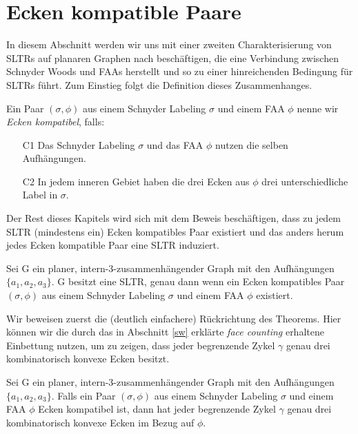 \section{Ecken kompatible Paare}

In diesem Abschnitt werden wir uns mit einer zweiten Charakterisierung von SLTRs auf planaren Graphen nach \cite{af15} beschäftigen, die eine Verbindung zwischen Schnyder Woods und FAAs herstellt und so zu einer hinreichenden Bedingung für SLTRs führt. Zum Einstieg folgt die Definition dieses Zusammenhanges.

\begin{definition}\label{def_coco}
Ein Paar $(\sigma,\phi)$ aus einem Schnyder Labeling $\sigma$ und einem FAA $\phi$ nenne wir \textit{Ecken kompatibel}, falls:
\begin{itemize}
\item [C1] Das Schnyder Labeling $\sigma$ und das FAA $\phi$ nutzen die selben Aufhängungen.
\item [C2] In jedem inneren Gebiet haben die drei Ecken aus $\phi$ drei unterschiedliche Label in $\sigma$.
\end{itemize}
\end{definition}

Der Rest dieses Kapitels wird sich mit dem Beweis beschäftigen, dass zu jedem SLTR (mindestens ein) Ecken kompatibles Paar existiert und das anders herum jedes Ecken kompatible Paar eine SLTR induziert.

\begin{theorem}\label{theo_coco}
Sei G ein planer, intern-3-zusammenhängender Graph mit den Aufhängungen $\{a_1,a_2,a_3\}$. G besitzt eine SLTR, genau dann wenn ein Ecken kompatibles Paar $(\sigma,\phi)$ aus einem Schnyder Labeling $\sigma$ und einem FAA $\phi$ existiert.
\end{theorem}

Wir beweisen zuerst die (deutlich einfachere) Rückrichtung des Theorems. Hier können wir die durch das in Abschnitt \ref{sw} erklärte \textit{face counting} erhaltene Einbettung nutzen, um zu zeigen, dass jeder begrenzende Zykel $\gamma$ genau drei kombinatorisch konvexe Ecken besitzt.

\begin{lemma}\label{lem1}
Sei G ein planer, intern-3-zusammenhängender Graph mit den Aufhängungen $\{a_1,a_2,a_3\}$. Falls ein Paar $(\sigma,\phi)$ aus einem Schnyder Labeling $\sigma$ und einem FAA $\phi$ Ecken kompatibel ist, dann hat jeder begrenzende Zykel $\gamma$ genau drei kombinatorisch konvexe Ecken im Bezug auf $\phi$.
\end{lemma}

